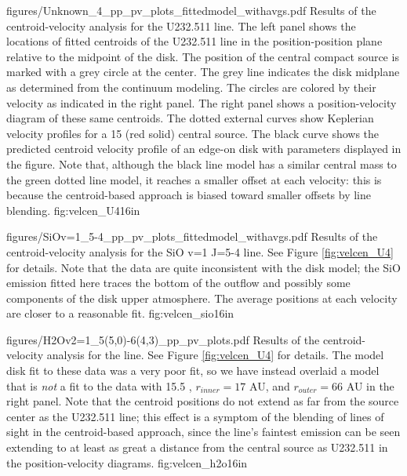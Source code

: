 \documentclass[twocolumn]{aastex61}
\begin{document}
\Figure
{figures/Unknown_4_pp_pv_plots_fittedmodel_withavgs.pdf}
{Results of the centroid-velocity analysis for the U232.511 line.
The left panel shows the locations of fitted centroids of the U232.511 line in
the position-position plane relative to the midpoint of the disk.  
The position of the central compact source is
marked with a grey circle at the center.  The grey line indicates the disk
midplane as determined from the continuum modeling.  The circles are colored by
their velocity as indicated in
the right panel.  The right panel shows a position-velocity diagram of these
same centroids.  The dotted external curves show Keplerian velocity profiles
for a  15 \msun (red solid) central source.
The black
curve shows the predicted centroid velocity profile of an edge-on disk with
parameters displayed in the figure.
Note that, although the black line model has a similar central mass to the
green dotted line model, it reaches a smaller offset at each velocity: this is
because the centroid-based approach is biased toward smaller offsets by line
blending.
}
{fig:velcen_U4}{1}{6in}

\Figure
{figures/SiOv=1_5-4_pp_pv_plots_fittedmodel_withavgs.pdf}
{Results of the centroid-velocity analysis for the SiO v=1 J=5-4 line.
See Figure \ref{fig:velcen_U4} for details.
Note that the data are quite inconsistent with the disk model;
the SiO emission fitted here traces the bottom of the outflow
and possibly some components of the disk upper atmosphere.
The average positions at each velocity are closer to a reasonable fit.
}
{fig:velcen_sio}{1}{6in}

\Figure
{figures/H2Ov2=1_5(5,0)-6(4,3)_pp_pv_plots.pdf}
{Results of the centroid-velocity analysis for the \water line.
See Figure \ref{fig:velcen_U4} for details.
The model disk fit to these data was a very poor fit, so we
have instead overlaid a model that is \emph{not} a fit to the data
with 15.5 \msun, $r_{inner}=17$ AU, and $r_{outer}=66$ AU in the
right panel.
Note that the centroid positions do not extend as far from
the source center as the U232.511 line; this effect is 
a symptom of the blending of lines of sight in the centroid-based approach,
since the \water line's faintest emission can be seen extending to at least as
great a distance from the central source as U232.511 in the position-velocity
diagrams.
}
{fig:velcen_h2o}{1}{6in}
\end{document}

